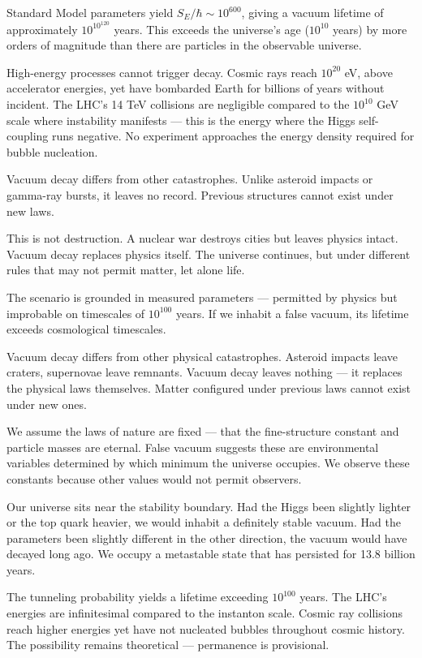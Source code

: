 Standard Model parameters yield $S_E/\hbar \sim 10^{600}$, giving a vacuum lifetime of approximately $10^{10^{120}}$ years. This exceeds the universe's age ($10^{10}$ years) by more orders of magnitude than there are particles in the observable universe.

High-energy processes cannot trigger decay. Cosmic rays reach $10^{20}$ eV, above accelerator energies, yet have bombarded Earth for billions of years without incident. The LHC's 14 TeV collisions are negligible compared to the $10^{10}$ GeV scale where instability manifests — this is the energy where the Higgs self-coupling runs negative. No experiment approaches the energy density required for bubble nucleation.

Vacuum decay differs from other catastrophes. Unlike asteroid impacts or gamma-ray bursts, it leaves no record. Previous structures cannot exist under new laws.

This is not destruction. A nuclear war destroys cities but leaves physics intact. Vacuum decay replaces physics itself. The universe continues, but under different rules that may not permit matter, let alone life.

The scenario is grounded in measured parameters — permitted by physics but improbable on timescales of $10^{100}$ years. If we inhabit a false vacuum, its lifetime exceeds cosmological timescales.

\newpage

\begin{commentary}
Vacuum decay differs from other physical catastrophes. Asteroid impacts leave craters, supernovae leave remnants. Vacuum decay leaves nothing — it replaces the physical laws themselves. Matter configured under previous laws cannot exist under new ones.

We assume the laws of nature are fixed — that the fine-structure constant and particle masses are eternal. False vacuum suggests these are environmental variables determined by which minimum the universe occupies. We observe these constants because other values would not permit observers.

Our universe sits near the stability boundary. Had the Higgs been slightly lighter or the top quark heavier, we would inhabit a definitely stable vacuum. Had the parameters been slightly different in the other direction, the vacuum would have decayed long ago. We occupy a metastable state that has persisted for 13.8 billion years.

The tunneling probability yields a lifetime exceeding $10^{100}$ years. The LHC's energies are infinitesimal compared to the instanton scale. Cosmic ray collisions reach higher energies yet have not nucleated bubbles throughout cosmic history. The possibility remains theoretical — permanence is provisional.
\end{commentary}
